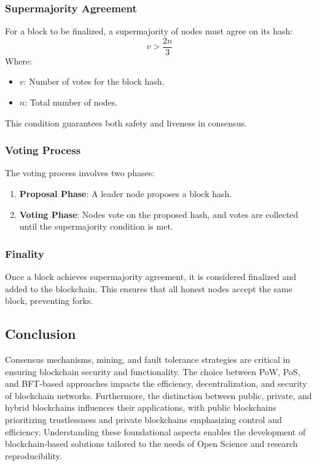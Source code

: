 \documentclass{article}
\begin{document}
\subsubsection{Supermajority Agreement}
For a block to be finalized, a supermajority of nodes must agree on its hash:
\[
    v > \frac{2n}{3}
\]
Where:
\begin{itemize}
    \item \( v \): Number of votes for the block hash.
    \item \( n \): Total number of nodes.
\end{itemize}

This condition guarantees both safety and liveness in consensus.

\subsubsection{Voting Process}

The voting process involves two phases:
\begin{enumerate}
    \item \textbf{Proposal Phase}: A leader node proposes a block hash.
    \item \textbf{Voting Phase}: Nodes vote on the proposed hash, and votes are collected until the supermajority condition is met.
\end{enumerate}

\subsubsection{Finality}
Once a block achieves supermajority agreement, it is considered finalized and added to the blockchain. This ensures that all honest nodes accept the same block, preventing forks.


\subsection{Conclusion}
Consensus mechanisms, mining, and fault tolerance strategies are critical in ensuring blockchain security and functionality. The choice between PoW, PoS, and BFT-based approaches impacts the efficiency, decentralization, and security of blockchain networks. Furthermore, the distinction between public, private, and hybrid blockchains influences their applications, with public blockchains prioritizing trustlessness and private blockchains emphasizing control and efficiency. Understanding these foundational aspects enables the development of blockchain-based solutions tailored to the needs of Open Science and research reproducibility.
\end{document}
